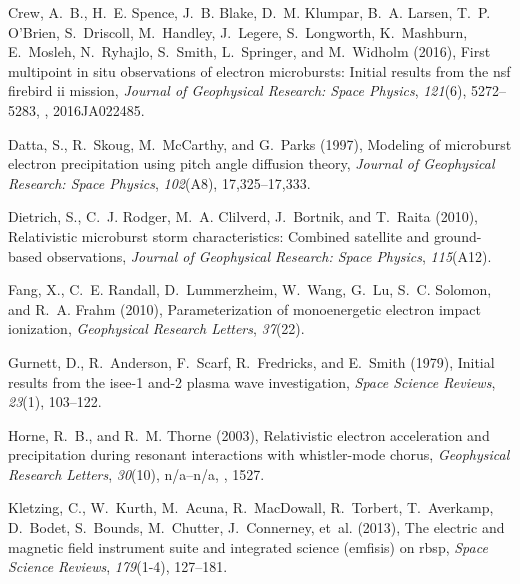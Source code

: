 \documentclass[draft, linenumbers]{agujournal}
\begin{document}
\begin{thebibliography}{49}
Crew, A.~B., H.~E. Spence, J.~B. Blake, D.~M. Klumpar, B.~A. Larsen, T.~P.
  O'Brien, S.~Driscoll, M.~Handley, J.~Legere, S.~Longworth, K.~Mashburn,
  E.~Mosleh, N.~Ryhajlo, S.~Smith, L.~Springer, and M.~Widholm (2016), First
  multipoint in situ observations of electron microbursts: Initial results from
  the nsf firebird ii mission, \textit{Journal of Geophysical Research: Space
  Physics}, \textit{121}(6), 5272--5283, ,
  2016JA022485.

Datta, S., R.~Skoug, M.~McCarthy, and G.~Parks (1997), Modeling of microburst
  electron precipitation using pitch angle diffusion theory, \textit{Journal of
  Geophysical Research: Space Physics}, \textit{102}(A8), 17,325--17,333.

Dietrich, S., C.~J. Rodger, M.~A. Clilverd, J.~Bortnik, and T.~Raita (2010),
  Relativistic microburst storm characteristics: Combined satellite and
  ground-based observations, \textit{Journal of Geophysical Research: Space
  Physics}, \textit{115}(A12).

Fang, X., C.~E. Randall, D.~Lummerzheim, W.~Wang, G.~Lu, S.~C. Solomon, and
  R.~A. Frahm (2010), Parameterization of monoenergetic electron impact
  ionization, \textit{Geophysical Research Letters}, \textit{37}(22).

Gurnett, D., R.~Anderson, F.~Scarf, R.~Fredricks, and E.~Smith (1979), Initial
  results from the isee-1 and-2 plasma wave investigation, \textit{Space
  Science Reviews}, \textit{23}(1), 103--122.

Horne, R.~B., and R.~M. Thorne (2003), Relativistic electron acceleration and
  precipitation during resonant interactions with whistler-mode chorus,
  \textit{Geophysical Research Letters}, \textit{30}(10), n/a--n/a,
  , 1527.

Kletzing, C., W.~Kurth, M.~Acuna, R.~MacDowall, R.~Torbert, T.~Averkamp,
  D.~Bodet, S.~Bounds, M.~Chutter, J.~Connerney, et~al. (2013), The electric
  and magnetic field instrument suite and integrated science (emfisis) on rbsp,
  \textit{Space Science Reviews}, \textit{179}(1-4), 127--181.


\end{thebibliography}
\end{document}
